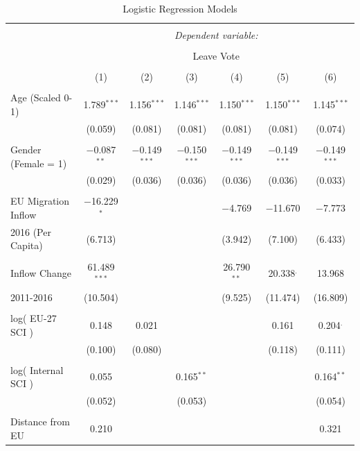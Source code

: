 \documentclass{article}
\begin{document}
\begin{table}[!htbp] \centering 
  \caption{Logistic Regression Models} 
  \label{table:regression} 
\begin{tabular}{@{\extracolsep{5pt}}lcccccc} 
\\[-1.8ex]\hline 
\hline \\[-1.8ex] 
 & \multicolumn{6}{c}{\textit{Dependent variable:}} \\ 
\cline{2-7} 
\\[-1.8ex] & \multicolumn{6}{c}{Leave Vote} \\ 
\\[-1.8ex] & (1) & (2) & (3) & (4) & (5) & (6)\\ 
\hline \\[-1.8ex] 
 Age (Scaled 0-1) & 1.789$^{***}$ & 1.156$^{***}$ & 1.146$^{***}$ & 1.150$^{***}$ & 1.150$^{***}$ & 1.145$^{***}$ \\ 
  & (0.059) & (0.081) & (0.081) & (0.081) & (0.081) & (0.074) \\ 
  & & & & & & \\ 
 Gender (Female = 1) & $-$0.087$^{**}$ & $-$0.149$^{***}$ & $-$0.150$^{***}$ & $-$0.149$^{***}$ & $-$0.149$^{***}$ & $-$0.149$^{***}$ \\ 
  & (0.029) & (0.036) & (0.036) & (0.036) & (0.036) & (0.033) \\ 
  & & & & & & \\ 
 EU Migration Inflow & $-$16.229$^{*}$ &  &  & $-$4.769 & $-$11.670 & $-$7.773 \\ 
 2016 (Per Capita) & (6.713) &  &  & (3.942) & (7.100) & (6.433) \\ 
  & & & & & & \\ 
 Inflow Change & 61.489$^{***}$ &  &  & 26.790$^{**}$ & 20.338$^{.}$ & 13.968 \\ 
 2011-2016 & (10.504) &  &  & (9.525) & (11.474) & (16.809) \\ 
  & & & & & & \\ 
 log( EU-27 SCI ) & 0.148 & 0.021 &  &  & 0.161 & 0.204$^{.}$ \\ 
  & (0.100) & (0.080) &  &  & (0.118) & (0.111) \\ 
  & & & & & & \\ 
 log( Internal SCI ) & 0.055 &  & 0.165$^{**}$ &  &  & 0.164$^{**}$ \\ 
  & (0.052) &  & (0.053) &  &  & (0.054) \\ 
  & & & & & & \\ 
 Distance from EU & 0.210 &  &  &  &  & 0.321 \\ 

\end{tabular}
\end{table}
\end{document}
